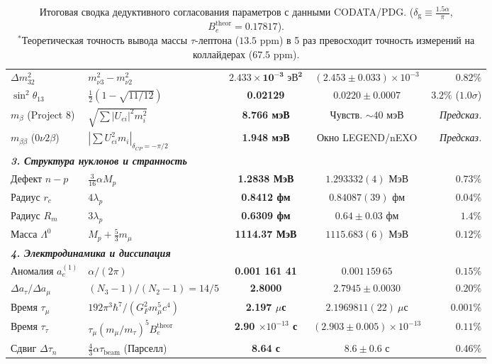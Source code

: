 \documentclass[12pt,a4paper]{article}
\begin{document}
\begin{table}[h!]
\begin{tabularx}{\textwidth}{l p{4.6cm} c c r}
			$\Delta m_{32}^2$ & $m_{\nu 3}^2 - m_{\nu 2}^2$ & $\mathbf{2.433 \times 10^{-3} \text{ эВ}^2}$ & $(2.453 \pm 0.033) \times 10^{-3}$ & $\mathbf{0.82\%}$ \\
			$\sin^2\theta_{13}$ & $\frac{1}{2}\left(1 - \sqrt{11/12}\right)$ & \textbf{0.02129} & $0.0220 \pm 0.0007$ & $\mathbf{3.2\%}$ ($1.0\sigma$) \\
			$m_\beta$ (Project 8) & $\sqrt{\sum |U_{ei}|^2 m_i^2}$ & \textbf{8.766 мэВ} & Чувств. $\sim 40$ мэВ & \textit{Предсказ.} \\
			$m_{\beta\beta}$ ($0\nu 2\beta$) & $|\sum U_{ei}^2 m_i|_{\delta_{CP}=-\pi/2}$ & \textbf{1.948 мэВ} & Окно LEGEND/nEXO & \textit{Предсказ.} \\
			\midrule
			\multicolumn{5}{l}{\textit{\textbf{3. Структура нуклонов и странность}}} \\
			Дефект $n - p$ & $\frac{3}{16}\alpha M_p$ & \textbf{1.2838 МэВ} & $1.293332(4)$ МэВ & $\mathbf{0.73\%}$ \\
			Радиус $r_c$ & $4 \lambda_p$ & \textbf{0.8412 фм} & $0.84087(39)$ фм & $\mathbf{0.04\%}$ \\
			Радиус $R_m$ & $3 \lambda_p$ & \textbf{0.6309 фм} & $0.64 \pm 0.03$ фм & $\mathbf{1.4\%}$ \\
			Масса $\Lambda^0$ & $M_p + \frac{5}{3}m_\mu$ & \textbf{1114.37 МэВ} & $1115.683(6)$ МэВ & $\mathbf{0.12\%}$ \\
			\midrule
			\multicolumn{5}{l}{\textit{\textbf{4. Электродинамика и диссипация}}} \\
			Аномалия $a_e^{(1)}$ & $\alpha / (2\pi)$ & \textbf{0.001 161 41} & $0.001\,159\,65$ & $\mathbf{0.15\%}$ \\
			$\Delta a_\tau / \Delta a_\mu$ & $(N_3 - 1)/(N_2 - 1) = 14/5$ & \textbf{2.8000} & $2.7945 \pm 0.0030$ & $\mathbf{0.20\%}$ \\
			Время $\tau_\mu$ & $192\pi^3\hbar^7 / (G_F^2 m_\mu^5 c^4)$ & \textbf{2.197 $\mu$с} & $2.1969811(22) \ \mu$с & $\mathbf{0.001\%}$ \\
			Время $\tau_\tau$ & $\tau_\mu (m_\mu/m_\tau)^5 B_e^{\text{theor}}$ & \textbf{2.90 $\times 10^{-13}$ с} & $(2.903 \pm 0.005) \times 10^{-13}$ & $\mathbf{0.11\%}$ \\
			Сдвиг $\Delta\tau_n$ & $\frac{4}{3}\alpha \tau_{\text{beam}}$ (Парселл) & \textbf{8.64 с} & $8.6 \pm 0.6$ с & $\mathbf{0.46\%}$ \\
			\bottomrule
		\end{tabularx}
		\caption{Итоговая сводка дедуктивного согласования параметров с данными CODATA/PDG. ($\delta_{\text{g}} \equiv \frac{1.5\alpha}{\pi}$, $B_e^{\text{theor}} = 0.17817$).\\
			$^*$Теоретическая точность вывода массы $\tau$-лептона ($13.5$ ppm) в 5 раз превосходит точность измерений на коллайдерах ($67.5$ ppm).}
		\label{tab:final_summary}
	\end{table}
	
\end{document}
